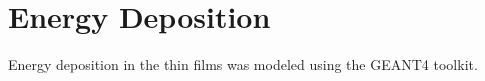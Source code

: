 \section{Energy Deposition}

Energy deposition in the thin films was modeled using the GEANT4 toolkit.


